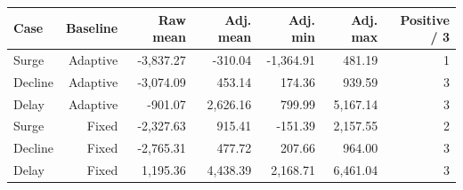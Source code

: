\begin{tabular}{lrrrrrr}
\toprule
Case & Baseline & Raw mean & Adj. mean & Adj. min & Adj. max & Positive / 3 \\
\midrule
Surge & Adaptive & -3,837.27 & -310.04 & -1,364.91 & 481.19 & 1 \\
Decline & Adaptive & -3,074.09 & 453.14 & 174.36 & 939.59 & 3 \\
Delay & Adaptive & -901.07 & 2,626.16 & 799.99 & 5,167.14 & 3 \\
Surge & Fixed & -2,327.63 & 915.41 & -151.39 & 2,157.55 & 2 \\
Decline & Fixed & -2,765.31 & 477.72 & 207.66 & 964.00 & 3 \\
Delay & Fixed & 1,195.36 & 4,438.39 & 2,168.71 & 6,461.04 & 3 \\
\bottomrule
\end{tabular}
